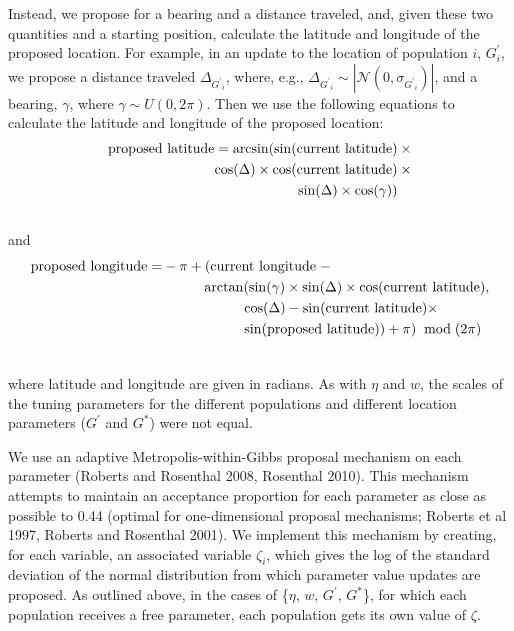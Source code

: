 \documentclass[12pt]{article}
\newcommand{\identifyadmixsource}[1]{{#1^{*}}}
\begin{document}
Instead, we propose for a bearing and a distance traveled, and, given these two quantities and a starting position, calculate the latitude and longitude of the proposed location.  For example, in an update to the location of population $i$, $G^{\prime}_i$, we propose a distance traveled $\Delta_{{G^{\prime}}_i}$, where, e.g., $\Delta_{{G^{\prime}}_i}  \sim | \mathcal{N}(0,\sigma_{{G^{\prime}}_i})|$, and a bearing, $\gamma$, where $\gamma \sim U(0,2\pi)$.  Then we use the following equations to calculate the latitude and longitude of the proposed location:
\begin{align}
\text{proposed latitude} = \arcsin(\sin(\text{current latitude}) \: &\times\\  \notag
					\cos(\Delta) \times \cos(\text{current latitude}) \:&\times\\  \notag
					\sin(\Delta) \times \cos(\gamma))   \:&\phantom{\times}\\  \notag
\end{align}
and
\begin{align}
\text{proposed longitude} = & - \pi + (\text{current longitude} \; - \\ \notag
					 	&\hspace{1cm} \arctan(
							\sin(\gamma) \times
							\sin(\Delta) \times
							\cos(\text{current latitude}) , \\ \notag
						& \hspace{2cm} \cos(\Delta) - 
							\sin(\text{current latitude}) \times \\ \notag
						& \hspace{2cm} \sin(\text{proposed latitude})) + \pi) \; \bmod (2\pi) \\ \notag
\end{align}

where latitude and longitude are given in radians.  As with $\eta$ and $w$, the scales of the tuning parameters for the different populations and different location parameters ($G^{\prime}$ and $\identifyadmixsource{G}$) were not equal.

We use an adaptive Metropolis-within-Gibbs proposal mechanism on each parameter (Roberts and Rosenthal 2008, Rosenthal 2010).  This mechanism attempts to maintain an acceptance proportion for each parameter as close as possible to 0.44 (optimal for one-dimensional proposal mechanisms; Roberts et al 1997, Roberts and Rosenthal 2001).  We implement this mechanism by creating, for each variable, an associated variable $\zeta_i$, which gives the log of the standard deviation of the normal distribution from which parameter value updates are proposed.  As outlined above, in the cases of \{$\eta$, $w$, $G^{\prime}$, $\identifyadmixsource{G}$\}, for which each population receives a free parameter, each population gets its own value of $\zeta$.  
\end{document}
